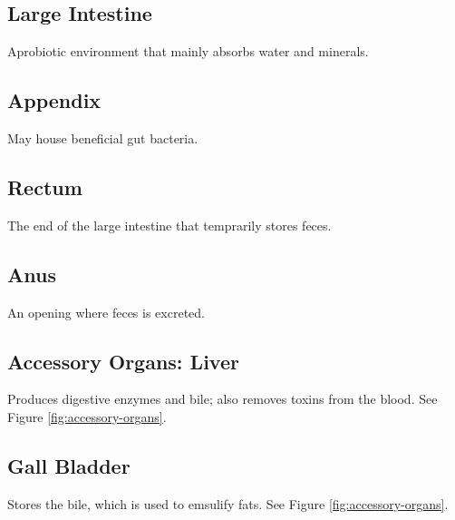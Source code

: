 \documentclass[12pt]{report}
\begin{document}
\subsection{Large Intestine}
\begin{definition}
    Aprobiotic environment that mainly absorbs water and minerals.
\end{definition}

\subsection{Appendix}
\begin{definition}[Appendix]
    May house beneficial gut bacteria.
\end{definition}

\subsection{Rectum}
\begin{definition}[Rectum]
    The end of the large intestine that temprarily stores feces.
\end{definition}

\subsection{Anus}
\begin{definition}[Anus]
    An opening where feces is excreted.
\end{definition}

\divider

\subsection{Accessory Organs: Liver}
\begin{definition}[Liver]
    Produces digestive enzymes and bile; also removes toxins from the blood. See Figure \ref{fig:accessory-organs}.

\end{definition}

\subsection{Gall Bladder}
\begin{definition}
    Stores the bile, which is used to emsulify fats. See Figure \ref{fig:accessory-organs}.
\end{definition}
\end{document}
